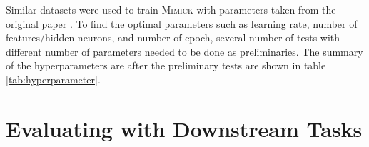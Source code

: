         Similar datasets were used to train \textsc{Mimick} with
        parameters taken from the original paper
        \citep{mimicking2017Pinter}. To find the optimal parameters
        such as learning rate, number of features/hidden neurons, and
        number of epoch, several number of tests with different number
        of parameters needed to be done as preliminaries. The summary
        of the hyperparameters are after the preliminary tests are
        shown in table \ref{tab:hyperparameter}.


    
\section{Evaluating with Downstream Tasks}
